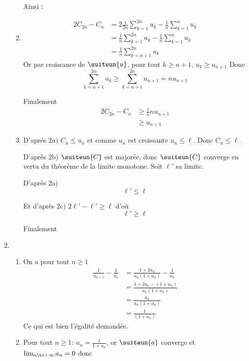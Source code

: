 \begin{correction}
\begin{enumerate}
\begin{enumerate}
Ainsi :


\item \begin{eqnarray}
2 C_{2n}-C_n &= 2 \frac{1}{2n }\sum_{k=1}^{2n} u_k - \frac{1}{n }\sum_{k=1}^{n} u_k\\
					&= \frac{1}{n }\sum_{k=1}^{2n} u_k - \frac{1}{n }\sum_{k=1}^{n} u_k\\
				&= \frac{1}{n }\sum_{k=n+1}^{2n} u_k 
\end{eqnarray}
Or par croissance de $\suiteun{u}$, pour tout $k\geq n+1$, $u_k\geq u_{n+1}$ Donc  
$$\sum_{k=n+1}^{2n} u_k  \geq \sum_{k=n+1}^{2n} u_{n+1} = nu_{n+1}$$

Finalement 
\begin{eqnarray*}
2 C_{2n}-C_n &\geq \frac{1}{n }nu_{n+1}\\ 
					&\geq u_{n+1}
\end{eqnarray*}


\item D'aprés $2a)$ $C_n \leq u_n$ et comme $u_n $ est croissante $u_n\leq \ell$. Donc $C_n\leq \ell$. 

D'après 2b) $\suiteun{C} $ est majorée, donc $\suiteun{C}$ converge en vertu du théorème de la limite monotone.  Soit $\ell'$ sa limite. 

D'après 2a) $$\ell' \leq \ell$$

Et d'après 2c) $2 \ell' - \ell' \geq \ell $ d'où $$\ell' \geq \ell$$

Finalement




\end{enumerate}
\item \begin{enumerate}
\item On a pour tout $n\geq 1$
\begin{eqnarray*}
\frac{1}{a_{n+1}} -\frac{1}{a_n} &= \frac{1+2a_n}{a_n(1+a_n)} -\frac{1}{a_n}\\
&= \frac{1+2a_n - (1+a_n)}{a_n(1+a_n)} \\
&= \frac{a_n}{a_n(1+a_n)} \\
&= \frac{1}{(1+a_n)} 
\end{eqnarray*}
Ce qui est bien l'égalité demandée. 
\item Pour tout $n\geq 1$:  $u_n =\frac{1}{1+a_n}$, or $\suiteun{a}$ converge et $\lim_{n\tv+\infty} a_n =0$ donc 


\end{enumerate}
\end{enumerate}
\end{correction}
